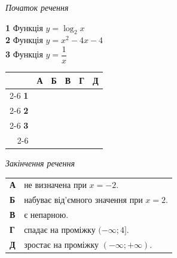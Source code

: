 \documentclass[14pt]{extarticle}
\begin{document}
\vspace{0.3cm}

\noindent
\begin{minipage}[t]{0.40\textwidth}
    \textit{Початок речення} \par \vspace{0.2cm}
    \textbf{1} \quad Функція $y = \log_2 x$ \\[0.2cm]
    \textbf{2} \quad Функція $y = x^2 - 4x - 4$ \\[0.2cm]
    \textbf{3} \quad Функція $y = \dfrac{1}{x}$
    
    \vspace{0.5cm}
    
    \begingroup
    \setlength{\tabcolsep}{4pt}
    \renewcommand{\arraystretch}{1.2}
    \small
    \begin{tabular}{r|c|c|c|c|c|}
         \multicolumn{1}{c}{} & \multicolumn{1}{c}{\textbf{А}} & \multicolumn{1}{c}{\textbf{Б}} & \multicolumn{1}{c}{\textbf{В}} & \multicolumn{1}{c}{\textbf{Г}} & \multicolumn{1}{c}{\textbf{Д}} \\ \cline{2-6}
         \textbf{1} & & & & & \\ \cline{2-6}
         \textbf{2} & & & & & \\ \cline{2-6}
         \textbf{3} & & & & & \\ \cline{2-6}
    \end{tabular}
    \endgroup
\end{minipage}%
\hfill
\begin{minipage}[t]{0.55\textwidth}
    \textit{Закінчення речення} \par \vspace{0.2cm}
    \begin{tabular}{ll}
    \textbf{А} & не визначена при $x = -2$. \\
    \textbf{Б} & набуває від’ємного значення при $x = 2$. \\
    \textbf{В} & є непарною. \\
    \textbf{Г} & спадає на проміжку $(-\infty; 4]$. \\
    \textbf{Д} & зростає на проміжку $(-\infty; +\infty)$. \\
    \end{tabular}
\end{minipage}

\vspace{0.7cm}
\end{document}

